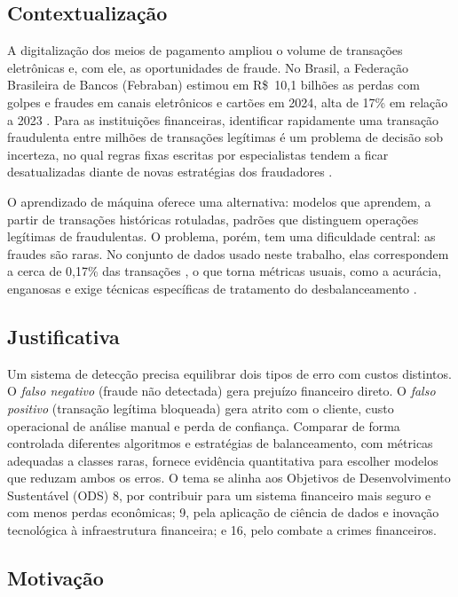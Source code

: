 \documentclass[12pt]{article}
\begin{document}
\subsection{Contextualização}

A digitalização dos meios de pagamento ampliou o volume de transações
eletrônicas e, com ele, as oportunidades de fraude. No Brasil, a Federação
Brasileira de Bancos (Febraban) estimou em R\$~10,1 bilhões as perdas com
golpes e fraudes em canais eletrônicos e cartões em 2024, alta de 17\% em
relação a 2023 \cite{poder360:2025}. Para as instituições financeiras,
identificar rapidamente uma transação fraudulenta entre milhões de transações
legítimas é um problema de decisão sob incerteza, no qual regras fixas escritas
por especialistas tendem a ficar desatualizadas diante de novas estratégias dos
fraudadores \cite{dalpozzolo:2018}.

O aprendizado de máquina oferece uma alternativa: modelos que aprendem, a partir
de transações históricas rotuladas, padrões que distinguem operações legítimas
de fraudulentas. O problema, porém, tem uma dificuldade central: as fraudes são
raras. No conjunto de dados usado neste trabalho, elas correspondem a cerca de
0,17\% das transações \cite{kaggle:ulb}, o que torna métricas usuais, como a
acurácia, enganosas e exige técnicas específicas de tratamento do
desbalanceamento \cite{chawla:2002,saito:2015}.

\subsection{Justificativa}

Um sistema de detecção precisa equilibrar dois tipos de erro com custos
distintos. O \emph{falso negativo} (fraude não detectada) gera prejuízo
financeiro direto. O \emph{falso positivo} (transação legítima bloqueada) gera
atrito com o cliente, custo operacional de análise manual e perda de confiança.
Comparar de forma controlada diferentes algoritmos e estratégias de
balanceamento, com métricas adequadas a classes raras, fornece evidência
quantitativa para escolher modelos que reduzam ambos os erros. O tema se alinha
aos Objetivos de Desenvolvimento Sustentável (ODS) 8, por contribuir para um
sistema financeiro mais seguro e com menos perdas econômicas; 9, pela aplicação
de ciência de dados e inovação tecnológica à infraestrutura financeira; e 16,
pelo combate a crimes financeiros.

\subsection{Motivação}
\end{document}
